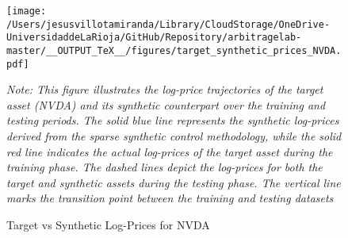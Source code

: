 \begin{figure}[H]
  \caption{Target vs Synthetic Log-Prices for NVDA}
  \centering
  \texttt{[image: /Users/jesusvillotamiranda/Library/CloudStorage/OneDrive-UniversidaddeLaRioja/GitHub/Repository/arbitragelab-master/\_\_OUTPUT\_TeX\_\_/figures/target\_synthetic\_prices\_NVDA.pdf]}
\label{fig:target_synthetic_prices_NVDA}
\vspace{0.5cm}
\begin{minipage}{\textwidth}
\setlength{\parindent}{0pt}
\small\textit{Note: 
This figure illustrates the log-price trajectories of the target asset (NVDA) and its synthetic counterpart over the training and testing periods. The solid blue line represents the synthetic log-prices derived from the sparse synthetic control methodology, while the solid red line indicates the actual log-prices of the target asset during the training phase. The dashed lines depict the log-prices for both the target and synthetic assets during the testing phase. The vertical line marks the transition point between the training and testing datasets
}
\end{minipage}
\end{figure}

